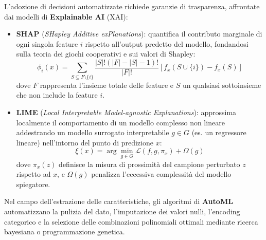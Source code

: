 \documentclass[11pt, a4paper]{article}
\begin{document}
L'adozione di decisioni automatizzate richiede garanzie di trasparenza, affrontate dai modelli di \textbf{Explainable AI} (XAI):
\begin{itemize}
    \item \textbf{SHAP} (\emph{SHapley Additive exPlanations}): quantifica il contributo marginale di ogni singola feature $i$ rispetto all'output predetto del modello, fondandosi sulla teoria dei giochi cooperativi e sui valori di Shapley:
    \begin{equation}
        \phi_i(x) = \sum_{S \subseteq F \setminus \{i\}} \frac{|S|!(|F| - |S| - 1)!}{|F|!} \left[ f_x(S \cup \{i\}) - f_x(S) \right]
    \end{equation}
    dove $F$ rappresenta l'insieme totale delle feature e $S$ un qualsiasi sottoinsieme che non include la feature $i$.
    \item \textbf{LIME} (\emph{Local Interpretable Model-agnostic Explanations}): approssima localmente il comportamento di un modello complesso non lineare addestrando un modello surrogato interpretabile $g \in G$ (es. un regressore lineare) nell'intorno del punto di predizione $x$:
    \begin{equation}
        \xi(x) = \arg\min_{g \in G} \mathcal{L}(f, g, \pi_x) + \Omega(g)
    \end{equation}
    dove $\pi_x(z)$ definisce la misura di prossimità del campione perturbato $z$ rispetto ad $x$, e $\Omega(g)$ penalizza l'eccessiva complessità del modello spiegatore.
\end{itemize}

Nel campo dell'estrazione delle caratteristiche, gli algoritmi di \textbf{AutoML} automatizzano la pulizia del dato, l'imputazione dei valori nulli, l'encoding categorico e la selezione delle combinazioni polinomiali ottimali mediante ricerca bayesiana o programmazione genetica.
\end{document}
